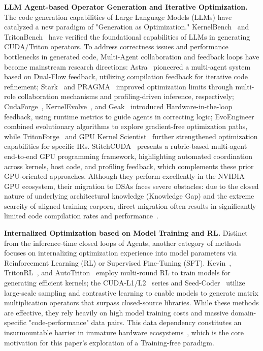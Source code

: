 \documentclass{article}
\theoremstyle{plain}
\theoremstyle{definition}
\theoremstyle{remark}
\begin{document}
\noindent\textbf{LLM Agent-based Operator Generation and Iterative Optimization.}
The code generation capabilities of Large Language Models (LLMs) have catalyzed a new paradigm of "Generation as Optimization." KernelBench~\cite{ouyang2025kernelbench} and TritonBench~\cite{li2025tritonbench} have verified the foundational capabilities of LLMs in generating CUDA/Triton operators. To address correctness issues and performance bottlenecks in generated code, Multi-Agent collaboration and feedback loops have become mainstream research directions: Astra~\cite{wei2025astra} pioneered a multi-agent system based on Dual-Flow feedback, utilizing compilation feedback for iterative code refinement; Stark~\cite{dong2025stark} and PRAGMA~\cite{lei2025pragma} improved optimization limits through multi-role collaboration mechanisms and profiling-driven inference, respectively; CudaForge~\cite{zhang2025cudaforge}, KernelEvolve~\cite{liao2025kernelevolve}, and Geak~\cite{wang2025geak} introduced Hardware-in-the-loop feedback, using runtime metrics to guide agents in correcting logic; EvoEngineer~\cite{guo2025evoengineer} combined evolutionary algorithms to explore gradient-free optimization paths, while TritonForge~\cite{li2025tritonforge} and GPU Kernel Scientist~\cite{andrews2025gpu} further strengthened optimization capabilities for specific IRs. StitchCUDA~\cite{li2026stitchcuda} presents a rubric-based multi-agent end-to-end GPU programming framework, highlighting automated coordination across kernels, host code, and profiling feedback, which complements these prior GPU-oriented approaches.
Although they perform excellently in the NVIDIA GPU ecosystem, their migration to DSAs faces severe obstacles: due to the closed nature of underlying architectural knowledge (Knowledge Gap) and the extreme scarcity of aligned training corpora, direct migration often results in significantly limited code compilation rates and performance~\cite{wen2025multikernelbench,cao2026ascendkernelgen}.

\noindent\textbf{Internalized Optimization based on Model Training and RL.}
Distinct from the inference-time closed loops of Agents, another category of methods focuses on internalizing optimization experience into model parameters via Reinforcement Learning (RL) or Supervised Fine-Tuning (SFT). Kevin~\cite{baronio2025kevin}, TritonRL~\cite{woo2025tritonrl}, and AutoTriton~\cite{li2025autotriton} employ multi-round RL to train models for generating efficient kernels; the CUDA-L1/L2~\cite{li2025cuda,su2025cuda} series and Seed-Coder~\cite{seed2025seed} utilize large-scale sampling and contrastive learning to enable models to generate matrix multiplication operators that surpass closed-source libraries. While these methods are effective, they rely heavily on high model training costs and massive domain-specific "code-performance" data pairs. This data dependency constitutes an insurmountable barrier in immature hardware ecosystems~\cite{wen2025multikernelbench}, which is the core motivation for this paper's exploration of a Training-free paradigm.
\end{document}

